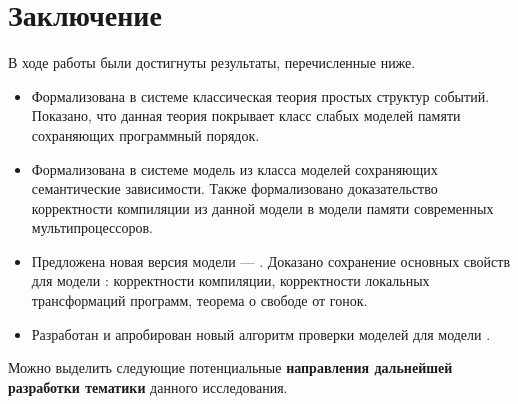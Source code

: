 \chapter*{Заключение}                       %


В ходе работы были достигнуты результаты, перечисленные ниже.

\begin{itemize}

  \item Формализована в системе \coq классическая теория
    простых структур событий. Показано, что данная теория
    покрывает класс слабых моделей памяти сохраняющих программный порядок. 

  \item Формализована в системе \coq модель \Wkm из
    класса моделей сохраняющих семантические зависимости.
    Также формализовано доказательство корректности компиляции
    из данной модели в модели памяти современных мультипроцессоров.

  \item Предложена новая версия модели \Wkm --- \WkmS.
    Доказано сохранение основных свойств \Wkm для модели \WkmS:
    корректности компиляции, корректности локальных трансформаций программ, 
    теорема о свободе от гонок.

  \item Разработан и апробирован новый алгоритм проверки моделей \wmc для модели \WkmS.

\end{itemize}

Можно выделить следующие потенциальные
\textbf{направления дальнейшей разработки тематики}
данного исследования.


